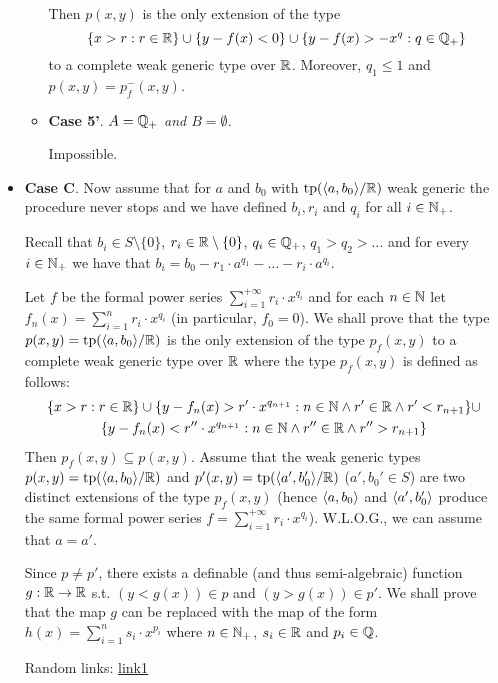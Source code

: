 \documentclass[11pt]{article}
\begin{document}
\begin{itemize}
\begin{itemize}
Then \(p(x,y)\) is the only extension of the type
\begin{equation*}
\{x>r:r\in\mathbb{R}\}\cup\{y-f(x)<0\}\cup\{y-f(x)>-x^q:q\in\mathbb{Q}_+\}
\end{equation*}
to a complete weak generic type over \(\mathbb{R}\). Moreover, \(q_1\le 1\) and \(p(x,y)=p_f^-(x,y)\).
\item \textbf{Case 5'}. \emph{\(A=\mathbb{Q}_+\) and \(B=\emptyset\).}

Impossible.
\end{itemize}
\item \textbf{Case C}. Now assume that for \(a\) and \(b_0\) with \(\operatorname{tp}(\langle a,b_0\rangle/\mathbb{R})\) weak generic the
procedure never stops and we have defined \(b_i,r_i\) and \(q_i\) for all \(i\in\mathbb{N}_+\).

Recall that \(b_i\in S\setminus\{0\}\), \(r_i\in\mathbb{R}\setminus\{0\}\), \(q_i\in\mathbb{Q}_+\), \(q_1>q_2>\dots\) and for every \(i\in\mathbb{N}_+\) we have
that \(b_i=b_0-r_1\cdot a^{q_1}-\dots-r_i\cdot a^{q_i}\).

Let \(f\) be the formal power series \(\sum_{i=1}^{+\infty}r_i\cdot x^{q_i}\) and for each \(n\in\mathbb{N}\)
let \(f_n(x)=\sum_{i=1}^nr_i\cdot x^{q_i}\) (in particular, \(f_0=0\)). We shall prove that the
type \(p(x,y)=\operatorname{tp}(\langle a,b_0\rangle/\mathbb{R})\) is the only extension of the type \(p_f(x,y)\) to a complete
weak generic type over \(\mathbb{R}\) where the type \(p_f(x,y)\) is defined as follows:
\begin{gather*}
  \{x>r:r\in\mathbb{R}\}\cup\{y-f_n(x)>r'\cdot x^{q_{n+1}}:n\in\mathbb{N}\wedge r'\in\mathbb{R}\wedge r'<r_{n+1}\}\cup\\
  \{y-f_n(x)<r''\cdot x^{q_{n+1}}:n\in\mathbb{N}\wedge r''\in\mathbb{R}\wedge r''>r_{n+1}\}
\end{gather*}
Then \(p_f(x,y)\subseteq p(x,y)\). Assume that the weak generic types \(p(x,y)=\operatorname{tp}(\langle a,b_0\rangle/\mathbb{R})\)
and \(p'(x,y)=\operatorname{tp}(\langle a',b_0'\rangle/\mathbb{R})\) (\(a',b_0'\in S\)) are two distinct extensions of the
type \(p_f(x,y)\) (hence \(\langle a,b_0\rangle\) and \(\langle a',b_0'\rangle\) produce the same formal power
series \(f=\sum_{i=1}^{+\infty}r_i\cdot x^{q_i}\)). W.L.O.G., we can assume that \(a=a'\).

Since \(p\neq p'\), there exists a definable (and thus semi-algebraic) function \(g:\mathbb{R}\to\mathbb{R}\)
s.t. \((y<g(x))\in p\) and \((y>g(x))\in p'\). We shall prove that the map \(g\) can be replaced
with the map of the form \(h(x)=\sum_{i=1}^ns_i\cdot x^{p_i}\) where \(n\in\mathbb{N}_+\), \(s_i\in\mathbb{R}\) and \(p_i\in\mathbb{Q}\).

Random links: \href{http://homepages.math.uic.edu/\~jan/mcs563s14/puiseux.pdf}{link1}


\end{itemize}
\end{document}
